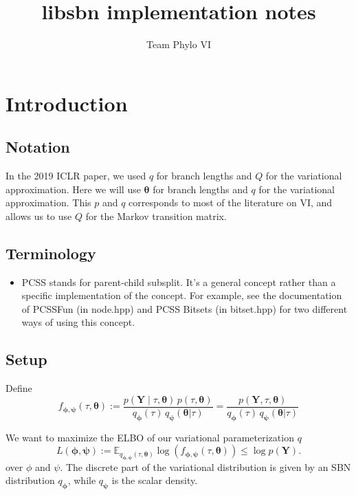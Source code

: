 \documentclass{article}
\title{libsbn implementation notes}
\author{Team Phylo VI}
\begin{document}
\maketitle


\section*{Introduction}

\subsection*{Notation}

In the 2019 ICLR paper, we used $q$ for branch lengths and $Q$ for the variational approximation.
Here we will use $\bm \theta$ for branch lengths and $q$ for the variational approximation.
This $p$ and $q$ corresponds to most of the literature on VI, and allows us to use $Q$ for the Markov transition matrix.


\subsection*{Terminology}

\begin{itemize}
    \item PCSS stands for parent-child subsplit.
  It's a general concept rather than a specific implementation of the concept.
    For example, see the documentation of PCSSFun (in node.hpp) and PCSS Bitsets (in bitset.hpp) for two different ways of using this concept.
\end{itemize}


\subsection*{Setup}

Define
\[
    f_{\bm{\phi},{\bm{\psi}}}(\tau, \bm \theta) :=
    \frac{p(\bm{Y} \mid \tau, \bm{\theta}) \, p(\tau, \bm{\theta})}
    {q_{\bm{\phi}}(\tau)\, q_{\bm{\psi}}(\bm{\theta}|\tau)}
    = \frac{p(\bm{Y}, \tau, \bm{\theta})}
    {q_{\bm{\phi}}(\tau)\, q_{\bm{\psi}}(\bm{\theta}|\tau)}
\]

We want to maximize the ELBO of our variational parameterization $q$
\[
L(\bm{\phi},{\bm{\psi}}) :=
\mathbb{E}_{q_{\bm{\phi},{\bm{\psi}}}(\tau, \bm{\theta})}
\log\left( f_{\bm{\phi},{\bm{\psi}}}(\tau, \bm \theta) \right) \leq \log p(\bm{Y}).
\]
over $\phi$ and $\psi$.
The discrete part of the variational distribution is given by an SBN distribution $q_{\bm\phi}$, while $q_{\bm\psi}$ is the scalar density.
\end{document}
